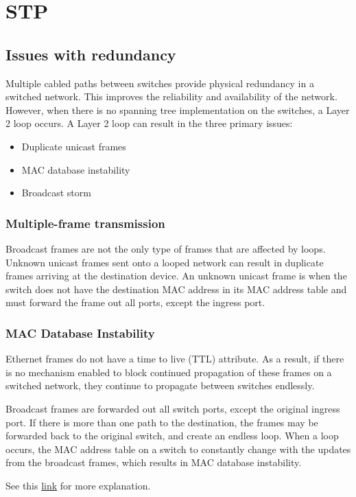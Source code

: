 \chapter{STP}
\section{Issues with redundancy}
Multiple cabled paths between switches provide physical redundancy in a switched network. This improves the reliability and availability of the network. However, when there is no spanning tree implementation on the switches, a Layer 2 loop occurs. A Layer 2 loop can result in the three primary issues:
\begin{itemize}
\item Duplicate unicast frames
\item MAC database instability
\item Broadcast storm
\end{itemize}
\subsection{Multiple-frame transmission}
Broadcast frames are not the only type of frames that are affected by loops. Unknown unicast frames sent onto a looped network can result in duplicate frames arriving at the destination device. An unknown unicast frame is when the switch does not have the destination MAC address in its MAC address table and must forward the frame out all ports, except the ingress port.
\subsection{MAC Database Instability}
Ethernet frames do not have a time to live (TTL) attribute. As a result, if there is no mechanism enabled to block continued propagation of these frames on a switched network, they continue to propagate between switches endlessly. \par 
Broadcast frames are forwarded out all switch ports, except the original ingress port. If there is more than one path to the destination, the frames may be forwarded back to the original switch, and create an endless loop. When a loop occurs, the MAC address table on a switch to constantly change with the updates from the broadcast frames, which results in MAC database instability. \par 
See this \href{https://ccnav6.com/s3/course/module2/2.1.1.2/2.1.1.2.html}{link} for more explanation.
